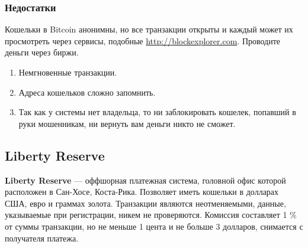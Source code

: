 \subsubsection{Недостатки}
\begin{important}
Кошельки в Bitcoin анонимны, но все транзакции открыты и каждый может их просмотреть через сервисы, подобные \url{http://blockexplorer.com}. Проводите деньги через биржи.
\end{important}
\begin{enumerate}
\item Немгновенные транзакции.
\item Адреса кошельков сложно запомнить.
\item Так как у системы нет владельца, то ни заблокировать кошелек, попавший в руки мошенникам, ни вернуть вам деньги никто не сможет.
\end{enumerate}
\subsection{Liberty Reserve}
\textbf{Liberty Reserve} --- оффшорная платежная система, головной офис которой расположен в Сан-Хосе, Коста-Рика. Позволяет иметь кошельки в долларах США, евро и граммах золота. Транзакции являются неотменяемыми, данные, указываемые при регистрации, никем не проверяются. Комиссия составляет 1 \% от суммы транзакции, но не меньше 1 цента и не больше 3 долларов, снимается с получателя платежа.
